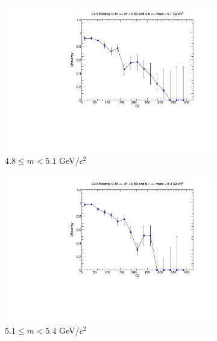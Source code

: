 \documentclass[11pt]{article}
\begin{document}
\begin{figure}[p]
\begin{subfigure}[b]{0.32\textwidth}
        \includegraphics[width=\textwidth]{./kTrackerEfficiencyPlots/D2_Efficiency_xF9_mass2.pdf}
        \caption{$4.8 \leq m < 5.1$ GeV/$c^2$}
    \end{subfigure}\vspace{0.5cm}
    \begin{subfigure}[b]{0.32\textwidth}
        \centering
        \includegraphics[width=\textwidth]{./kTrackerEfficiencyPlots/D2_Efficiency_xF9_mass3.pdf}
        \caption{$5.1 \leq m < 5.4$ GeV/$c^2$}
    \end{subfigure}\hfill
    \begin{subfigure}[b]{0.32\textwidth}
        \centering

\end{subfigure}
\end{figure}
\end{document}
